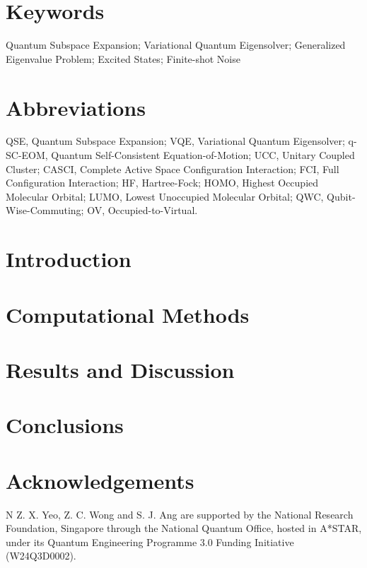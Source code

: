 \documentclass[letterpaper]{article}
\begin{document}
\section*{Keywords}

Quantum Subspace Expansion; 
Variational Quantum Eigensolver; 
Generalized Eigenvalue Problem; 
Excited States;
Finite-shot Noise

\section*{Abbreviations}

QSE, Quantum Subspace Expansion; 
VQE, Variational Quantum Eigensolver; 
q-SC-EOM, Quantum Self-Consistent Equation-of-Motion; 
UCC, Unitary Coupled Cluster; 
CASCI, Complete Active Space Configuration Interaction; 
FCI, Full Configuration Interaction; 
HF, Hartree-Fock; 
HOMO, Highest Occupied Molecular Orbital; 
LUMO, Lowest Unoccupied Molecular Orbital; 
QWC, Qubit-Wise-Commuting;
OV, Occupied-to-Virtual.

\section{Introduction}


\section{Computational Methods}


\section{Results and Discussion}


\section{Conclusions}


\section*{Acknowledgements}
N Z. X. Yeo, Z. C. Wong and S. J. Ang are supported by the National Research Foundation, Singapore through the National Quantum Office, hosted in A*STAR, under its Quantum Engineering Programme 3.0 Funding Initiative (W24Q3D0002).
\end{document}
